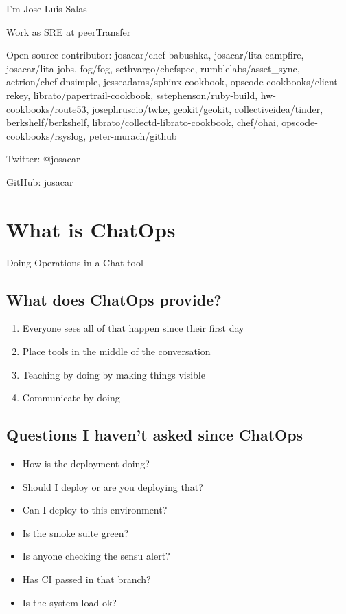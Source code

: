 \documentclass[
paper=128mm:96mm, %
fontsize=11pt, %
pagesize, %
parskip=half-, %
]{scrartcl} %
\theoremstyle{mythmstyle} %
\begin{document}
I'm Jose Luis Salas

Work as SRE at peerTransfer

Open source contributor: josacar/chef-babushka, josacar/lita-campfire, josacar/lita-jobs, fog/fog, sethvargo/chefspec, rumblelabs/asset\_sync, aetrion/chef-dnsimple, jesseadams/sphinx-cookbook, opscode-cookbooks/client-rekey, librato/papertrail-cookbook, sstephenson/ruby-build, hw-cookbooks/route53, josephruscio/twke, geokit/geokit, collectiveidea/tinder, berkshelf/berkshelf, librato/collectd-librato-cookbook, chef/ohai, opscode-cookbooks/rsyslog, peter-murach/github

Twitter: @josacar

GitHub: josacar

\clearpage


\section{What is ChatOps}

Doing Operations in a Chat tool

\subsection{What does ChatOps provide?}

\begin{enumerate}
\item Everyone sees all of that happen since their first day
\item Place tools in the middle of the conversation
\item Teaching by doing by making things visible
\item Communicate by doing
\end{enumerate}

\clearpage


\subsection{Questions I haven't asked since ChatOps}
\begin{itemize}
\item How is the deployment doing?
\item Should I deploy or are you deploying that?
\item Can I deploy to this environment?
\item Is the smoke suite green?
\item Is anyone checking the sensu alert?
\item Has CI passed in that branch?
\item Is the system load ok?
\end{itemize}
\end{document}
